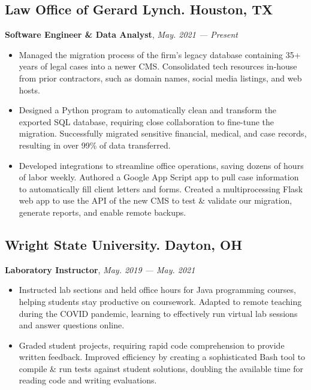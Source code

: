 \documentclass[12pt]{resume}
\begin{document}
\subsection{Law Office of Gerard Lynch. Houston, TX}
\textbf{Software Engineer \& Data Analyst}, \textit{May. 2021 --- Present}\\
\vspace{0.15em}
\begin{minipage}{\linewidth}
    \begin{itemize}
        \item Managed the migration process of the firm's legacy database containing 35+ years of legal cases into a newer CMS. Consolidated tech resources in-house from prior contractors, such as domain names, social media listings, and web hosts.
        \item Designed a Python program to automatically clean and transform the exported SQL database, requiring close collaboration to fine-tune the migration. Successfully migrated sensitive financial, medical, and case records, resulting in over 99\% of data transferred.
        \item Developed integrations to streamline office operations, saving dozens of hours of labor weekly. Authored a Google App Script app to pull case information to automatically fill client letters and forms. Created a multiprocessing Flask web app to use the API of the new CMS to test \& validate our migration, generate reports, and enable remote backups.
    \end{itemize}
\end{minipage}

\subsection{Wright State University. Dayton, OH}
\textbf{Laboratory Instructor}, \textit{May. 2019 --- May. 2021}\\
\vspace{0.15em}
\begin{minipage}{\linewidth}
    \begin{itemize}
        \item Instructed lab sections and held office hours for Java programming courses, helping students stay productive on coursework. Adapted to remote teaching during the COVID pandemic, learning to effectively run virtual lab sessions and answer questions online.
        \item Graded student projects, requiring rapid code comprehension to provide written feedback. Improved efficiency by creating a sophisticated Bash tool to compile \& run tests against student solutions, doubling the available time for reading code and writing evaluations.
    \end{itemize}
\end{minipage}
\end{document}
